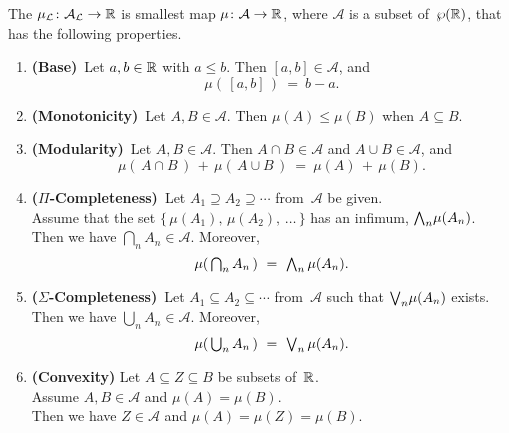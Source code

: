 \documentclass[main.tex]{subfiles}
\begin{document}
\begin{dfn}
\label{D:lebesgue-measure}
The 
$\mu_{\mathcal{L}} \colon \mathcal{A}_{\mathcal{L}} \rightarrow \mathbb{R}$
is smallest map $\mu\colon \mathcal{A} \rightarrow \mathbb{R}$,
where $\mathcal{A}$ is a subset of~$\wp(\mathbb{R})$,
that has the following properties.
\begin{enumerate}
\item
\label{prop:measure-1}
\textbf{(Base)}\ 
Let $a,b\in\mathbb{R}$ with $a\leq b$. Then $[a,b]\in\mathcal{A}$, and
\begin{equation*}
\mu(\,[a,b]\,)\ =\ b-a.
\end{equation*}

\item
\label{prop:measure-2}
\textbf{(Monotonicity)}\ 
Let $A,B\in \mathcal{A}$.
Then $\mu(A)\leq \mu(B)$
when  $A\subseteq B$.

\item
\label{prop:measure-3}
\textbf{(Modularity)}\ 
Let $A,B\in \mathcal{A}$.
Then $A\cap B\in\mathcal{A}$ and $A\cup B \in \mathcal{A}$, and
\begin{equation*}
\mu(\,A\cap B\,)\,+\,\mu(\,A\cup B\,)\ =\ \mu(A)\,+\,\mu(B).
\end{equation*}

\item
\label{prop:measure-4}
\textbf{($\Pi$-Completeness)}\ 
Let $A_1 \supseteq A_2 \supseteq \dotsb$
from~$\mathcal{A}$ be given.\\
Assume that the set $\{\,\mu(A_1),\, \mu(A_2),\, \dotsc\,\}$
has an infimum, $\textstyle{\bigwedge}_n \mu(A_n)$.\\
Then we have $\bigcap_n A_n \in \mathcal{A}$.
Moreover,
\begin{equation*}
\mu(\, \textstyle{ \bigcap_n A_n }\,) \ =\ \textstyle{\bigwedge}_n \,\mu(A_n).
\end{equation*}

\item
\label{prop:measure-5}
\textbf{($\Sigma$-Completeness)}\ 
Let $A_1 \subseteq A_2 \subseteq \dotsb$
from~$\mathcal{A}$ 
such that $\textstyle{\bigvee}_n \mu(A_n)$ exists.\\
Then we have $\bigcup_n A_n \in \mathcal{A}$.
Moreover,
\begin{equation*}
\mu(\, \textstyle{ \bigcup_n A_n }\,) \ =\ \textstyle{\bigvee}_n \,\mu(A_n).
\end{equation*}

\item
\label{prop:measure-6}
\textbf{(Convexity)}
Let $A\subseteq Z \subseteq B$ be subsets of~$\mathbb{R}$.\\
Assume $A,B\in\mathcal{A}$ and $\mu(A)=\mu(B)$.\\
Then we have $Z\in \mathcal{A}$ and $\mu(A) = \mu(Z)= \mu(B)$.
\end{enumerate}
\end{dfn}
\end{document}
